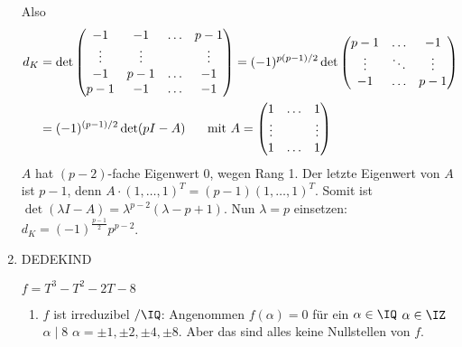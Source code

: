 \begin{Beispiel}
\begin{enumerate}
                Also \begin{align*} d_K&=\det\begin{pmatrix}
                             -1 & -1 & \hdots & p-1\\
                             \vdots & \vdots & & \vdots\\
                             -1 & p-1 & \hdots & -1\\
                             p-1 & -1 & \hdots & -1
                            \end{pmatrix} = (-1)^{p(p-1)/2}\det \begin{pmatrix}
                             p-1 & \hdots & -1\\
                             \vdots & \ddots & \vdots\\
                             -1 &  \hdots & p-1
                            \end{pmatrix}\\
                            &=(-1)^{(p-1)/2}\det(pI-A) \hspace{5mm}\mbox{ mit } A=\begin{pmatrix}
                                                                       1 & \hdots & 1\\
                                                                       \vdots& & \vdots\\
                                                                       1 & \hdots & 1
                                                                      \end{pmatrix}
\end{align*}
$A$ hat $(p-2)$-fache Eigenwert $0$, wegen Rang 1. Der letzte Eigenwert von $A$ ist $p-1$, denn $A\cdot (1,\ldots,1)^T=(p-1)(1,\ldots,1)^T$. Somit ist $\det (\lambda I-A)=\lambda^{p-2}(\lambda-p+1)$. Nun $\lambda=p$ einsetzen: $d_K=(-1)^{\frac{p-1}{2}}p^{p-2}$.
\item DEDEKIND

$f=T^3-T^2-2T-8$
\begin{enumerate}
 \item $f$ ist irreduzibel $/\IQ$: Angenommen $f(\alpha)=0$ für ein $\alpha\in\IQ$ \folge $\alpha\in\IZ$ \folge $\alpha\mid 8$ \folge $\alpha=\pm 1, \pm 2, \pm 4, \pm 8$. Aber das sind alles keine Nullstellen von $f$.
 

\end{enumerate}
\end{enumerate}
\end{Beispiel}
